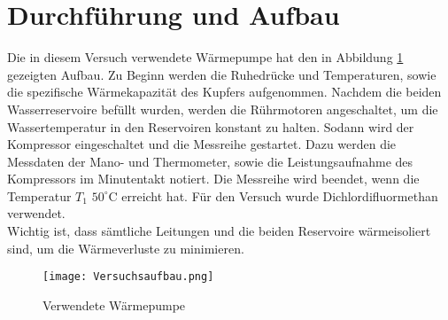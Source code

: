 \section{Durchführung und Aufbau}
\label{sec:Durchführung}

Die in diesem Versuch verwendete Wärmepumpe hat den in Abbildung \ref{img:VerwendeteWaermepumpe} gezeigten Aufbau. Zu Beginn werden die Ruhedrücke und Temperaturen, sowie die spezifische Wärmekapazität des Kupfers aufgenommen. Nachdem die beiden Wasserreservoire befüllt wurden, werden die Rührmotoren angeschaltet, um die Wassertemperatur in den Reservoiren konstant zu halten. Sodann wird der Kompressor eingeschaltet und die Messreihe gestartet. Dazu werden die Messdaten der Mano- und Thermometer, sowie die Leistungsaufnahme des Kompressors im Minutentakt notiert. Die Messreihe wird beendet, wenn die Temperatur $T_\text{1}$ $50^\circ \text{C}$ erreicht hat. Für den Versuch wurde Dichlordifluormethan verwendet. \\
Wichtig ist, dass sämtliche Leitungen und die beiden Reservoire wärmeisoliert sind, um die Wärmeverluste zu minimieren.
\begin{figure}
	\centering
	\texttt{[image: Versuchsaufbau.png]}
	\caption{Verwendete Wärmepumpe \cite{Abb}}
 	\label{img:VerwendeteWaermepumpe}
\end{figure}
\newpage
